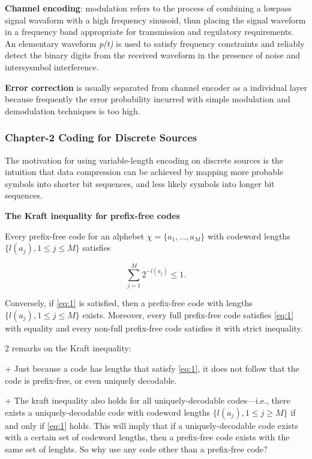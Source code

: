\documentclass[titlepage]{article}
\numberwithin{figure}{section}
\numberwithin{equation}{section}
\begin{document}
\textbf{Channel encoding}: modulation refers to the process of combining a lowpass signal wavaform with a high frequency sinusoid, thun placing the signal waveform in a frequency band appropriate for transmission and regulatory requirements. An elementary waveform \textit{p(t)} is used to satisfy frequency constraints and reliably detect the binary digits from the received waveform in the presence of noise and intersysmbol interference.

\textbf{Error correction} is usually separated from channel encoder as a individual layer because frequently the error probability incurred with simple modulation and demodulation techniques is too high.

\subsubsection{Chapter-2 Coding for Discrete Sources}

The motivation for using variable-length encoding on discrete sources is the intuition that data compression can be achieved by mapping more probable symbols into shorter bit sequences, and less likely symbols into longer bit sequences. 

\textbf{The Kraft inequality for prefix-free codes}

Every prefix-free code for an alphebet $\chi =\{a_{1}, ..., a_{M}\}$ with codeword lengths $\{l(a_{j}), 1 \leq j \leq M\}$ satisfies

\begin{equation}\label{eq:1}
\sum_{j=1}^{M} 2^{-l(a_{j})} \leq 1.
\end{equation}

Conversely, if \ref{eq:1} is satisfied, then a prefix-free code with lengths $\{l(a_{j}), 1 \leq j \leq M\}$ exists. Moreover, every full prefix-free code satisfies \ref{eq:1} with equality and every non-full prefix-free code satisfies it with strict inequality.

2 remarks on the Kraft inequality:

+	Just because a code has lengths that satisfy \ref{eq:1}, it does not follow that the code is prefix-free, or even uniquely decodable.

+	The kraft inequality also holds for all uniquely-decodable codes---i.e., there exists a uniquely-decodable code with codeword lengths $\{l(a_{j}), 1 \leq j \geq M\}$ if and only if \ref{eq:1} holds. This will imply that if a uniquely-decodable code exists with a certain set of codeword lengths, then a prefix-free code exists with the same set of lenghts. So why use any code other than a prefix-free code?
\end{document}
